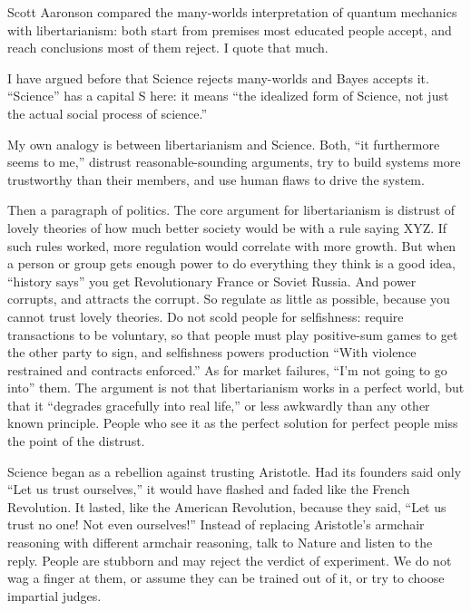 
Scott Aaronson compared the many-worlds interpretation of quantum mechanics with libertarianism: both start from premises most educated people accept, and reach conclusions most of them reject. I quote that much. 

I have argued before that Science rejects many-worlds and Bayes accepts it. ``Science'' has a capital S here: it means ``the idealized form of Science, not just the actual social process of science.'' 

My own analogy is between libertarianism and Science. Both, ``it furthermore seems to me,'' distrust reasonable-sounding arguments, try to build systems more trustworthy than their members, and use human flaws to drive the system.

Then a paragraph of politics. The core argument for libertarianism is distrust of lovely theories of how much better society would be with a rule saying XYZ. If such rules worked, more regulation would correlate with more growth. But when a person or group gets enough power to do everything they think is a good idea, ``history says'' you get Revolutionary France or Soviet Russia. And power corrupts, and attracts the corrupt. So regulate as little as possible, because you cannot trust lovely theories. Do not scold people for selfishness: require transactions to be voluntary, so that people must play positive-sum games to get the other party to sign, and selfishness powers production ``With violence restrained and contracts enforced.'' As for market failures, ``I'm not going to go into'' them. The argument is not that libertarianism works in a perfect world, but that it ``degrades gracefully into real life,'' or less awkwardly than any other known principle. People who see it as the perfect solution for perfect people miss the point of the distrust.

Science began as a rebellion against trusting Aristotle. Had its founders said only ``Let us trust ourselves,'' it would have flashed and faded like the French Revolution. It lasted, like the American Revolution, because they said, ``Let us trust no one! Not even ourselves!'' Instead of replacing Aristotle's armchair reasoning with different armchair reasoning, talk to Nature and listen to the reply. People are stubborn and may reject the verdict of experiment. We do not wag a finger at them, or assume they can be trained out of it, or try to choose impartial judges. 

